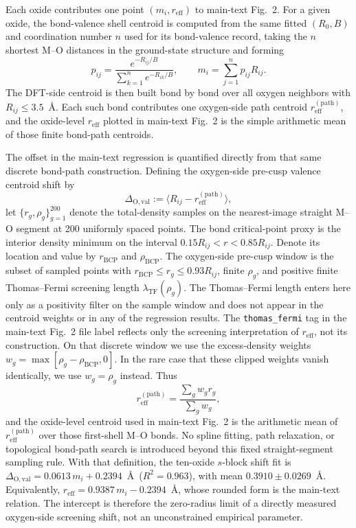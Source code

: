 \documentclass[aps,prmaterials,twocolumn,10pt,superscriptaddress,floatfix]{revtex4-2}
\begin{document}
Each oxide contributes one point $(m_i,r_{\mathrm{eff}})$ to
main-text Fig.~2.  For a given oxide, the bond-valence shell centroid is computed
from the same fitted $(R_0,B)$ and coordination number $n$ used for its
bond-valence record, taking the $n$ shortest M--O distances in the
ground-state structure and forming
\[
p_{ij}=\frac{e^{-R_{ij}/B}}{\sum_{k=1}^n e^{-R_{ik}/B}},
\qquad
m_i=\sum_{j=1}^n p_{ij}R_{ij}.
\]
The DFT-side centroid is then built bond by bond over all oxygen
neighbors with $R_{ij}\le 3.5$~\AA.  Each such bond contributes one
oxygen-side path centroid
$r_{\mathrm{eff}}^{(\mathrm{path})}$, and the oxide-level
$r_{\mathrm{eff}}$ plotted in main-text Fig.~2 is the simple arithmetic mean of
those finite bond-path centroids.

The offset in the main-text regression is quantified directly from that same
discrete bond-path construction.  Defining the oxygen-side pre-cusp valence centroid
shift by
\[
\Delta_{\mathrm{O,val}}:=\langle R_{ij}-r_{\mathrm{eff}}^{(\mathrm{path})}\rangle,
\]
let $\{r_g,\rho_g\}_{g=1}^{200}$ denote the total-density samples on the
nearest-image straight M--O segment at 200 uniformly spaced points.  The
bond critical-point proxy is the interior density minimum on the interval
$0.15R_{ij}<r<0.85R_{ij}$.  Denote its location and value by
$r_{\mathrm{BCP}}$ and $\rho_{\mathrm{BCP}}$.  The oxygen-side pre-cusp
window is the subset of sampled points with
$r_{\mathrm{BCP}}\le r_g\le 0.93R_{ij}$, finite $\rho_g$, and positive
finite Thomas--Fermi screening length $\lambda_{\mathrm{TF}}(\rho_g)$.
The Thomas--Fermi length enters here only as a positivity filter on the
sample window and does not appear in the centroid weights or in any of
the regression results.  The \texttt{thomas\_fermi} tag in the
main-text Fig.~2 file label reflects only the screening interpretation of
$r_{\mathrm{eff}}$, not its construction.
On that discrete window we use the excess-density weights
$w_g=\max[\rho_g-\rho_{\mathrm{BCP}},0]$.  In the rare case that these
clipped weights vanish identically, we use $w_g=\rho_g$ instead.  Thus
\[
r_{\mathrm{eff}}^{(\mathrm{path})}=
\frac{\sum_g w_g r_g}{\sum_g w_g},
\]
and the oxide-level centroid used in main-text Fig.~2 is the arithmetic mean of
$r_{\mathrm{eff}}^{(\mathrm{path})}$ over those first-shell M--O bonds.
No spline fitting, path relaxation, or topological bond-path search is
introduced beyond this fixed straight-segment sampling rule.  With that
definition, the ten-oxide $s$-block shift fit is
$\Delta_{\mathrm{O,val}} = 0.0613\,m_i + 0.2394$~\AA\
($R^2=0.963$), with mean $0.3910\pm0.0269$~\AA.  Equivalently,
$r_{\mathrm{eff}}=0.9387\,m_i-0.2394$~\AA, whose rounded form is the
main-text relation.  The intercept is therefore the zero-radius limit of
a directly measured oxygen-side screening shift, not an unconstrained
empirical parameter.
\end{document}
